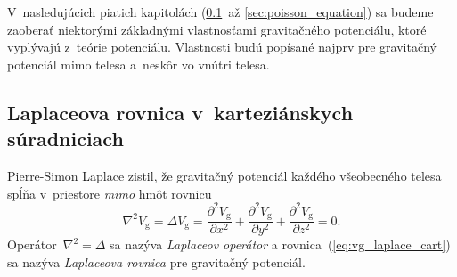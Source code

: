 \documentclass[a4paper, 12pt]{book}
\newcommand{\gidx}{\mathrm g}
\begin{document}
V~nasledujúcich piatich kapitolách (\ref{sec:laplace_equation_cart}~až 
\ref{sec:poisson_equation}) sa budeme zaoberať niektorými základnými
vlastnosťami gravitačného potenciálu, ktoré vyplývajú z~teórie potenciálu.
Vlastnosti budú popísané najprv pre gravitačný potenciál mimo telesa a~neskôr 
vo vnútri telesa.





\subsection{Laplaceova rovnica v~karteziánskych súradniciach}
\label{sec:laplace_equation_cart}

Pierre-Simon Laplace zistil, že gravitačný potenciál každého všeobecného telesa
spĺňa v~priestore \emph{mimo} hmôt rovnicu
%
\begin{equation}
\label{eq:vg_laplace_cart}
\nabla^2 V_\gidx = \Delta V_\gidx = \frac{\partial^2 V_\gidx}{\partial x^2}
+ \frac{\partial^2 V_\gidx}{\partial y^2} + \frac{\partial^2 V_\gidx}{\partial
z^2} = 0{.}
\end{equation}
%
Operátor~$\nabla^2 = \Delta$ sa nazýva \emph{Laplaceov operátor} 
a rovnica~(\ref{eq:vg_laplace_cart}) sa nazýva \emph{Laplaceova rovnica} pre
gravitačný potenciál.
\end{document}
